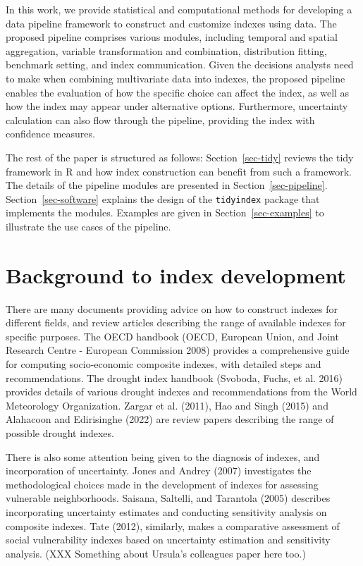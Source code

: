 \documentclass[
]{interact}
\begin{document}
In this work, we provide statistical and computational methods for
developing a data pipeline framework to construct and customize indexes
using data. The proposed pipeline comprises various modules, including
temporal and spatial aggregation, variable transformation and
combination, distribution fitting, benchmark setting, and index
communication. Given the decisions analysts need to make when combining
multivariate data into indexes, the proposed pipeline enables the
evaluation of how the specific choice can affect the index, as well as
how the index may appear under alternative options. Furthermore,
uncertainty calculation can also flow through the pipeline, providing
the index with confidence measures.

The rest of the paper is structured as follows: Section~\ref{sec-tidy}
reviews the tidy framework in R and how index construction can benefit
from such a framework. The details of the pipeline modules are presented
in Section~\ref{sec-pipeline}. Section~\ref{sec-software} explains the
design of the \texttt{tidyindex} package that implements the modules.
Examples are given in Section~\ref{sec-examples} to illustrate the use
cases of the pipeline.

\hypertarget{background-to-index-development}{%
\section{Background to index
development}\label{background-to-index-development}}

There are many documents providing advice on how to construct indexes
for different fields, and review articles describing the range of
available indexes for specific purposes. The OECD handbook (OECD,
European Union, and Joint Research Centre - European Commission 2008)
provides a comprehensive guide for computing socio-economic composite
indexes, with detailed steps and recommendations. The drought index
handbook (Svoboda, Fuchs, et al. 2016) provides details of various
drought indexes and recommendations from the World Meteorology
Organization. Zargar et al. (2011), Hao and Singh (2015) and Alahacoon
and Edirisinghe (2022) are review papers describing the range of
possible drought indexes.

There is also some attention being given to the diagnosis of indexes,
and incorporation of uncertainty. Jones and Andrey (2007) investigates
the methodological choices made in the development of indexes for
assessing vulnerable neighborhoods. Saisana, Saltelli, and Tarantola
(2005) describes incorporating uncertainty estimates and conducting
sensitivity analysis on composite indexes. Tate (2012), similarly, makes
a comparative assessment of social vulnerability indexes based on
uncertainty estimation and sensitivity analysis. (XXX Something about
Ursula's colleagues paper here too.)
\end{document}
